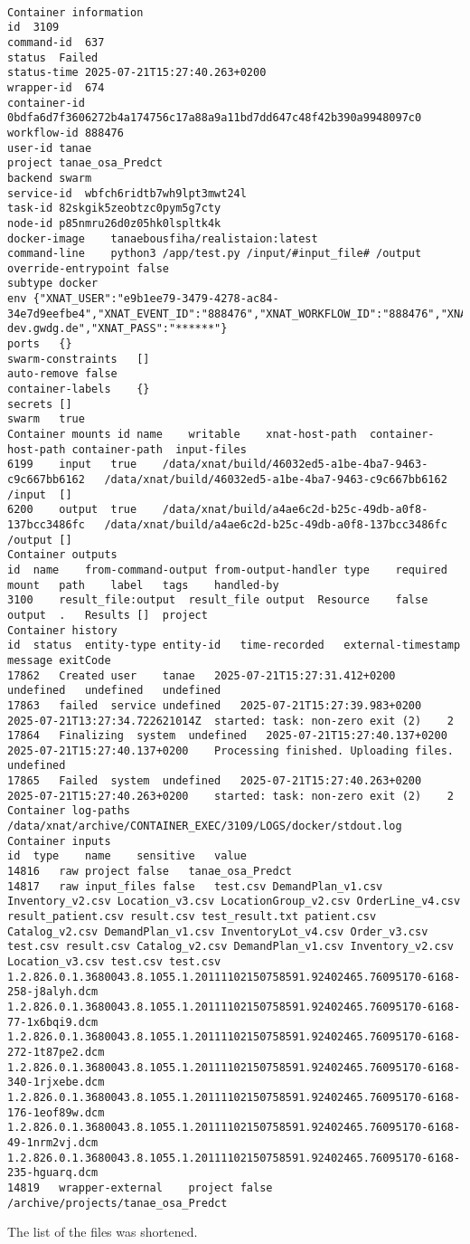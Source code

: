 \begin{lstlisting}

Container information
id	3109
command-id	637
status	Failed
status-time	2025-07-21T15:27:40.263+0200
wrapper-id	674
container-id	0bdfa6d7f3606272b4a174756c17a88a9a11bd7dd647c48f42b390a9948097c0
workflow-id	888476
user-id	tanae
project	tanae_osa_Predct
backend	swarm
service-id	wbfch6ridtb7wh9lpt3mwt24l
task-id	82skgik5zeobtzc0pym5g7cty
node-id	p85nmru26d0z05hk0lspltk4k
docker-image	tanaebousfiha/realistaion:latest
command-line	python3 /app/test.py /input/#input_file# /output
override-entrypoint	false
subtype	docker
env	{"XNAT_USER":"e9b1ee79-3479-4278-ac84-34e7d9eefbe4","XNAT_EVENT_ID":"888476","XNAT_WORKFLOW_ID":"888476","XNAT_HOST":"https://xnat-dev.gwdg.de","XNAT_PASS":"******"}
ports	{}
swarm-constraints	[]
auto-remove	false
container-labels	{}
secrets	[]
swarm	true
Container mounts id	name	writable	xnat-host-path	container-host-path	container-path	input-files
6199	input	true	/data/xnat/build/46032ed5-a1be-4ba7-9463-c9c667bb6162	/data/xnat/build/46032ed5-a1be-4ba7-9463-c9c667bb6162	/input	[]
6200	output	true	/data/xnat/build/a4ae6c2d-b25c-49db-a0f8-137bcc3486fc	/data/xnat/build/a4ae6c2d-b25c-49db-a0f8-137bcc3486fc	/output	[]
Container outputs
id	name	from-command-output	from-output-handler	type	required	mount	path	label	tags	handled-by
3100	result_file:output	result_file	output	Resource	false	output	.	Results	[]	project
Container history
id	status	entity-type	entity-id	time-recorded	external-timestamp	message	exitCode
17862	Created	user	tanae	2025-07-21T15:27:31.412+0200	undefined	undefined	undefined
17863	failed	service	undefined	2025-07-21T15:27:39.983+0200	2025-07-21T13:27:34.722621014Z	started: task: non-zero exit (2)	2
17864	Finalizing	system	undefined	2025-07-21T15:27:40.137+0200	2025-07-21T15:27:40.137+0200	Processing finished. Uploading files.	undefined
17865	Failed	system	undefined	2025-07-21T15:27:40.263+0200	2025-07-21T15:27:40.263+0200	started: task: non-zero exit (2)	2
Container log-paths
/data/xnat/archive/CONTAINER_EXEC/3109/LOGS/docker/stdout.log
Container inputs
id	type	name	sensitive	value
14816	raw	project	false	tanae_osa_Predct
14817	raw	input_files	false	test.csv DemandPlan_v1.csv Inventory_v2.csv Location_v3.csv LocationGroup_v2.csv OrderLine_v4.csv result_patient.csv result.csv test_result.txt patient.csv Catalog_v2.csv DemandPlan_v1.csv InventoryLot_v4.csv Order_v3.csv test.csv result.csv Catalog_v2.csv DemandPlan_v1.csv Inventory_v2.csv Location_v3.csv test.csv test.csv 1.2.826.0.1.3680043.8.1055.1.20111102150758591.92402465.76095170-6168-258-j8alyh.dcm 1.2.826.0.1.3680043.8.1055.1.20111102150758591.92402465.76095170-6168-77-1x6bqi9.dcm 1.2.826.0.1.3680043.8.1055.1.20111102150758591.92402465.76095170-6168-272-1t87pe2.dcm 1.2.826.0.1.3680043.8.1055.1.20111102150758591.92402465.76095170-6168-340-1rjxebe.dcm 1.2.826.0.1.3680043.8.1055.1.20111102150758591.92402465.76095170-6168-176-1eof89w.dcm 1.2.826.0.1.3680043.8.1055.1.20111102150758591.92402465.76095170-6168-49-1nrm2vj.dcm  1.2.826.0.1.3680043.8.1055.1.20111102150758591.92402465.76095170-6168-235-hguarq.dcm
14819	wrapper-external	project	false	/archive/projects/tanae_osa_Predct
\end{lstlisting}
The list of the files was shortened.
